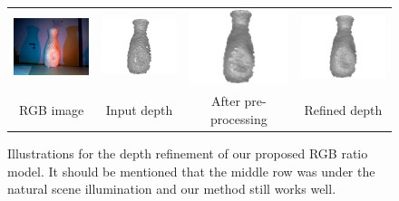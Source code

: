 \begin{figure}[!ht]
{\begin{tabular}{c|c c c}
   \includegraphics[height = 0.19\linewidth]{figures/methodology/ratio_vase_rgb.pdf}
   &
   \includegraphics[height = 0.19\linewidth]{figures/methodology/ratio_vase_shape_init.pdf} &
   \includegraphics[height = 0.19\linewidth]{figures/methodology/ratio_vase_shape_smooth.pdf} &
   \includegraphics[height = 0.19\linewidth]{figures/methodology/ratio_vase_shape.pdf} \\      {RGB image} & {Input depth} & {After pre-processing} &{Refined depth}                 
 \end{tabular}}
\caption{Illustrations for the depth refinement of our proposed RGB ratio model. It should be mentioned that the middle row was under the natural scene illumination and our method still works well.}
\label{fig:ratio_illustration}
\end{figure}



